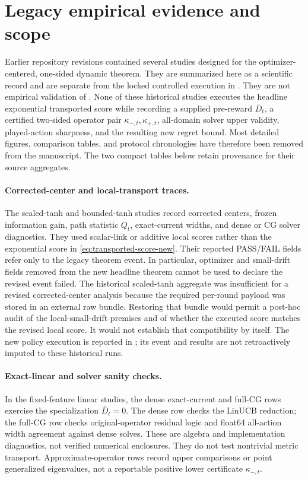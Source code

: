 \section{Legacy empirical evidence and scope}
\label{app:legacy-evidence}

Earlier repository revisions contained several studies designed for the
optimizer-centered, one-sided dynamic theorem.  They are summarized here as a
scientific record and are separate from the locked controlled execution in
.  They are not empirical validation of
.  None of these historical studies executes
the headline exponential transported score while recording a supplied pre-reward
$\bar D_t$, a certified two-sided operator pair $\kappa_{-,t},\kappa_{+,t}$,
all-domain solver upper validity, played-action sharpness, and the resulting new
regret bound.  Most detailed figures, comparison tables, and protocol
chronologies have therefore been removed from the manuscript.  The two compact
tables below retain provenance for their source aggregates.

\paragraph{Corrected-center and local-transport traces.}
The scaled-tanh and bounded-tanh studies record corrected centers, frozen
information gain, path statistic $Q_t$, exact-current widths, and dense or CG
solver diagnostics.  They used scalar-link or additive local scores rather than
the exponential score in \eqref{eq:transported-score-new}.  Their reported
PASS/FAIL fields refer only to the legacy theorem event.  In particular,
optimizer and small-drift fields removed from the new headline theorem cannot be
used to declare the revised event failed.  The historical scaled-tanh aggregate
was insufficient for a revised corrected-center analysis because the required
per-round payload was stored in an external raw bundle.  Restoring that bundle
would permit a post-hoc audit of the local-small-drift premises and of whether
the executed score matches the revised local score.  It would not establish that
compatibility by itself.  The new policy execution is reported in
; its event and results are not retroactively
imputed to these historical runs.

\paragraph{Exact-linear and solver sanity checks.}
In the fixed-feature linear studies, the dense exact-current and full-CG rows
exercise the specialization $\bar D_t=0$.  The dense row checks the LinUCB
reduction; the full-CG row checks original-operator residual logic and float64
all-action width agreement against dense solves.  These are algebra and
implementation diagnostics, not verified numerical enclosures.  They do not
test nontrivial metric transport.  Approximate-operator
rows record upper comparisons or point generalized eigenvalues, not a reportable
positive lower certificate $\kappa_{-,t}$.

